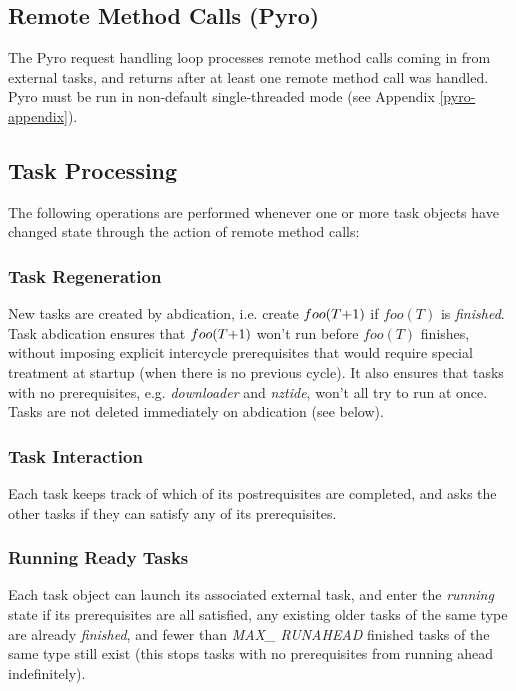 \documentclass[11pt,a4paper]{report}
\begin{document}
\subsection{Remote Method Calls (Pyro)}

The Pyro request handling loop processes remote method calls coming in
from external tasks, and returns after at least one remote method call
was handled. Pyro must be run in non-default single-threaded mode (see
Appendix \ref{pyro-appendix}).


\subsection{Task Processing}

The following operations are performed whenever one or more task objects
have changed state through the action of remote method calls: 

\subsubsection{Task Regeneration}

New tasks are created by abdication, i.e. create $foo(T\negmedspace
+\negmedspace 1)$ if $foo(T)$ is {\em finished}.  Task abdication
ensures that $foo(T\negmedspace +\negmedspace 1)$ won't run before
$foo(T)$ finishes, without imposing explicit intercycle prerequisites
that would require special treatment at startup (when there is no
previous cycle).  It also ensures that tasks with no prerequisites, e.g.
{\em downloader} and {\em nztide}, won't all try to run at once.
Tasks are not deleted immediately on abdication (see below).


\subsubsection{Task Interaction} 

Each task keeps track of which of its postrequisites are completed, and
asks the other tasks if they can satisfy any of its prerequisites. 

\subsubsection{Running Ready Tasks}

Each task object can launch its associated external task, and enter the
{\em running} state if its prerequisites are all satisfied, any existing
older tasks of the same type are already {\em finished}, and fewer than
{\em MAX\_ RUNAHEAD} finished tasks of the same type still exist (this
stops tasks with no prerequisites from running ahead indefinitely).
\end{document}

